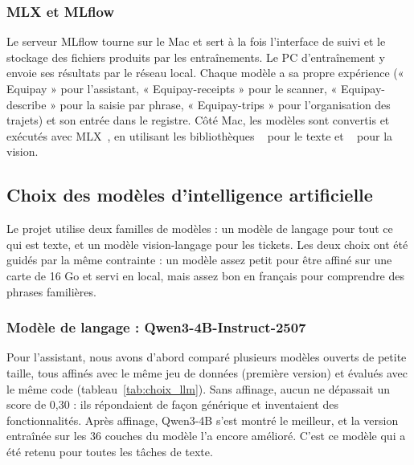 \subsubsection{MLX et MLflow}

Le serveur MLflow tourne sur le Mac et sert à la fois l'interface de suivi et le stockage
des fichiers produits par les entraînements. Le PC d'entraînement y envoie ses résultats
par le réseau local. Chaque modèle a sa propre expérience (« Equipay » pour l'assistant,
« Equipay-receipts » pour le scanner, « Equipay-describe » pour la saisie par phrase,
« Equipay-trips » pour l'organisation des trajets) et son entrée dans le registre. Côté Mac,
les modèles sont convertis et exécutés avec MLX~\cite{mlx}, en utilisant les bibliothèques
~\cite{mlxlm} pour le texte et ~\cite{mlxvlm} pour la vision.

\subsection{Choix des modèles d'intelligence artificielle}

Le projet utilise deux familles de modèles : un modèle de langage pour tout ce qui est
texte, et un modèle vision-langage pour les tickets. Les deux choix ont été guidés par la
même contrainte : un modèle assez petit pour être affiné sur une carte de 16 Go et servi
en local, mais assez bon en français pour comprendre des phrases familières.

\subsubsection{Modèle de langage : Qwen3-4B-Instruct-2507}

Pour l'assistant, nous avons d'abord comparé plusieurs modèles ouverts de petite taille,
tous affinés avec le même jeu de données (première version) et évalués avec le même code
(tableau~\ref{tab:choix_llm}). Sans affinage, aucun ne dépassait un score de 0,30 : ils
répondaient de façon générique et inventaient des fonctionnalités. Après affinage, Qwen3-4B
s'est montré le meilleur, et la version entraînée sur les 36 couches du modèle l'a encore
amélioré. C'est ce modèle qui a été retenu pour toutes les tâches de texte.

